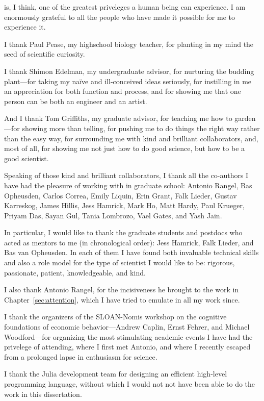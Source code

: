 
 is, I think, one of the greatest priveleges a human being can experience. I am enormously grateful to all the people who have made it possible for me to experience it.

I thank Paul Pease, my highschool biology teacher, for planting in my mind the seed of scientific curiosity.

I thank Shimon Edelman, my undergraduate advisor, for nurturing the budding plant---for taking my na\"ive and ill-conceived ideas seriously, for instilling in me an appreciation for both function and process, and for showing me that one person can be both an engineer and an artist.

And I thank Tom Griffiths, my graduate advisor, for teaching me how to garden---for showing more than telling, for pushing me to do things the right way rather than the easy way, for surrounding me with kind and brilliant collaborators, and, most of all, for showing me not just how to do good science, but how to be a good scientist.

Speaking of those kind and brilliant collaborators, I thank all the co-authors I have had the pleasure of working with in graduate school: Antonio Rangel, Bas Opheusden, Carlos Correa, Emily Liquin, Erin Grant, Falk Lieder, Gustav Karreskog, James Hillis, Jess Hamrick, Mark Ho, Matt Hardy, Paul Krueger, Priyam Das, Sayan Gul, Tania Lombrozo, Vael Gates, and Yash Jain.

In particular, I would like to thank the graduate students and postdocs who acted as mentors to me (in chronological order): Jess Hamrick, Falk Lieder, and Bas van Opheusden. In each of them I have found both invaluable technical skills and also a role model for the type of scientist I would like to be: rigorous, passionate, patient, knowledgeable, and kind.

I also thank Antonio Rangel, for the incisiveness he brought to the work in Chapter~\ref{sec:attention}, which I have tried to emulate in all my work since.

I thank the organizers of the SLOAN-Nomis workshop on the cognitive foundations of economic behavior---Andrew Caplin, Ernst Fehrer, and Michael Woodford---for organizing the most stimulating academic events I have had the privelege of attending, where I first met Antonio, and where I recently escaped from a prolonged lapse in enthusiasm for science.

I thank the Julia development team for designing an efficient high-level programming language, without which I would not not have been able to do the work in this dissertation.

